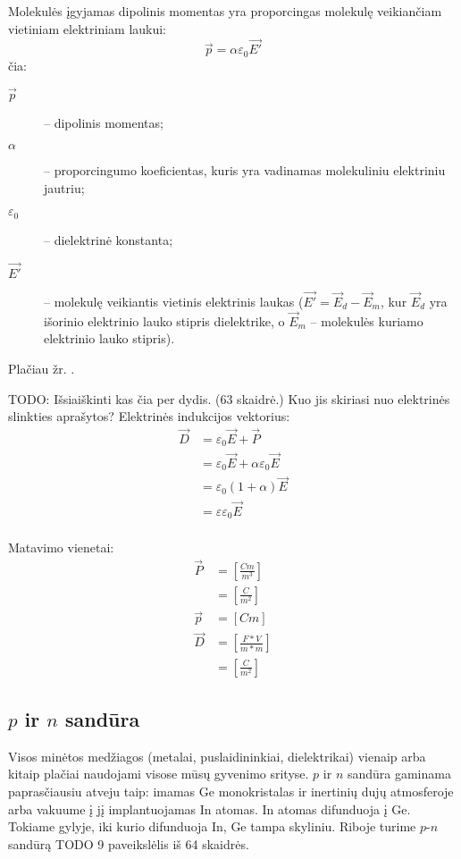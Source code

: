 Molekulės įgyjamas dipolinis momentas yra proporcingas molekulę
veikiančiam vietiniam elektriniam laukui:
\begin{equation*}
  \vec{p} = \alpha \varepsilon_{0} \vec{E'}
\end{equation*}
čia:
\begin{description}
  \item[$\vec{p}$] – dipolinis momentas;
  \item[$\alpha$] – proporcingumo koeficientas, kuris yra vadinamas
    molekuliniu elektriniu jautriu;
  \item[$\varepsilon_{0}$] – dielektrinė konstanta;
  \item[$\vec{E'}$] – molekulę veikiantis vietinis elektrinis laukas
    ($\vec{E'} = \vec{E}_{d} - \vec{E}_{m}$, kur $\vec{E}_{d}$ yra
    išorinio elektrinio lauko stipris dielektrike, o
    $\vec{E}_{m}$ – molekulės kuriamo elektrinio lauko stipris).
\end{description}
Plačiau žr. \cite[38p.]{elektra-magnetizmas}.

TODO: Išsiaiškinti kas čia per dydis. (63 skaidrė.) Kuo jis
skiriasi nuo elektrinės slinkties
aprašytos\cite[28p.]{elektra-magnetizmas}?
Elektrinės indukcijos vektorius:
\begin{align*}
  \vec{D}
  &= \varepsilon_{0}\vec{E} + \vec{P} \\
  &= \varepsilon_{0}\vec{E} + \alpha \varepsilon_{0} \vec{E} \\
  &= \varepsilon_{0}(1 + \alpha)\vec{E} \\
  &= \varepsilon \varepsilon_{0} \vec{E} \\
\end{align*}

Matavimo vienetai:
\begin{align*}
  \vec{P}
  &= \left[ \frac{Cm}{m^3} \right] \\
  &= \left[ \frac{C}{m^2} \right] \\
  \vec{p}
  &= \left[ Cm \right] \\
  \vec{D}
  &= \left[ \frac{F*V}{m*m} \right] \\
  &= \left[ \frac{C}{m^2} \right]
\end{align*}

\subsection{$p$ ir $n$ sandūra}

Visos minėtos medžiagos (metalai, puslaidininkiai, dielektrikai)
vienaip arba kitaip plačiai naudojami visose mūsų gyvenimo
srityse. $p$ ir $n$ sandūra gaminama paprasčiausiu atveju
taip: imamas Ge monokristalas ir inertinių dujų atmosferoje arba
vakuume į jį implantuojamas In atomas. In atomas difunduoja į
Ge. Tokiame gylyje, iki kurio difunduoja In, Ge tampa skyliniu.
Riboje turime $p$-$n$ sandūrą TODO 9 paveikslėlis iš 64 skaidrės.

